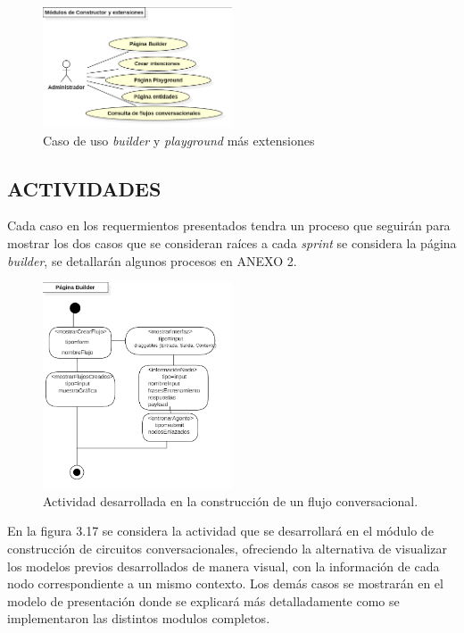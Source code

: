 \documentclass[letter, openright, 12pt]{book}
\begin{document}
\begin{figure}[H]
\centering
\includegraphics[width=0.5\textwidth]{figura3_16}
 \caption{Caso de uso {\it builder} y {\it playground} más extensiones}
\label{fig:figura3_16}
\end{figure}

\subsection{ACTIVIDADES}

Cada caso en los requermientos presentados tendra un proceso que seguirán para mostrar los dos casos que se consideran raíces a cada {\it sprint } se considera la página {\it builder}, se detallarán algunos procesos en ANEXO 2.

\begin{figure}[H]
\centering
\includegraphics[width=0.5\textwidth]{figura3_17}
 \caption{Actividad desarrollada en la construcción de un flujo conversacional. }
\label{fig:figura3_17}
\end{figure}

En la figura 3.17 se considera la actividad que se desarrollará en el módulo de construcción de circuitos conversacionales, ofreciendo la alternativa de visualizar los modelos previos desarrollados de manera visual, con la información de cada nodo correspondiente a un mismo contexto. 
Los demás casos se mostrarán en el modelo de presentación donde se explicará más detalladamente como se implementaron las distintos modulos completos. 
\end{document}
